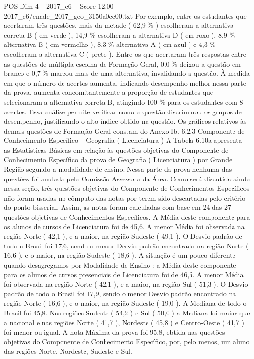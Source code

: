 \begin{textsample}{POS Dim 4 – 2017\_c6 – Score 12.00 – 2017\_c6/enade\_2017\_geo\_3150a0cc00.txt}
Por exemplo, entre os estudantes que acertaram três questões, mais da metade ( 62,9 \% ) escolheram a alternativa correta B ( em verde ), 14,9 \% escolheram a alternativa D ( em roxo ), 8,9 \% alternativa E ( em vermelho ), 8,3 \% alternativa A ( em azul ) e 4,3 \% escolheram a alternativa C ( preto ).
Entre os que acertaram três respostas entre as questões de múltipla escolha de Formação Geral, 0,0 \% deixou a questão em branco e 0,7 \% marcou mais de uma alternativa, invalidando a questão.
À medida em que o número de acertos aumenta, indicando desempenho melhor nessa parte da prova, aumenta concomitantemente a proporção de estudantes que selecionaram a alternativa correta B, atingindo 100 \% para os estudantes com 8 acertos.
Essa análise permite verificar como a questão discriminou os grupos de desempenho, justificando o alto índice obtido na questão.
Os gráficos relativos às demais questões de Formação Geral constam do Anexo Ib. 6.2.3 Componente de Conhecimento Específico – Geografia ( Licenciatura ) A Tabela 6.10a apresenta as Estatísticas Básicas em relação às questões objetivas do Componente de Conhecimento Específico da prova de Geografia ( Licenciatura ) por Grande Região segundo a modalidade de ensino.
Nessa parte da prova nenhuma das questões foi anulada pela Comissão Assessora da Área.
Como será discutido ainda nessa seção, três questões objetivas do Componente de Conhecimentos Específicos não foram usadas no cômputo das notas por terem sido descartadas pelo critério do ponto-bisserial.
Assim, as notas foram calculadas com base em 24 das 27 questões objetivas de Conhecimentos Específicos.
A Média deste componente para os alunos de cursos de Licenciatura foi de 45,6.
A menor Média foi observada na região Norte ( 42,1 ), e a maior, na região Sudeste ( 49,1 ).
O Desvio padrão de todo o Brasil foi 17,6, sendo o menor Desvio padrão encontrado na região Norte ( 16,6 ), e o maior, na região Sudeste ( 18,6 ).
A situação é um pouco diferente quando desagregamos por Modalidade de Ensino : a Média deste componente para os alunos de cursos presenciais de Licenciatura foi de 46,5.
A menor Média foi observada na região Norte ( 42,1 ), e a maior, na região Sul ( 51,3 ).
O Desvio padrão de todo o Brasil foi 17,9, sendo o menor Desvio padrão encontrado na região Norte ( 16,6 ), e o maior, na região Sudeste ( 19,0 ).
A Mediana de todo o Brasil foi 45,8.
Nas regiões Sudeste ( 54,2 ) e Sul ( 50,0 ) a Mediana foi maior que a nacional e nas regiões Norte ( 41,7 ), Nordeste ( 45,8 ) e Centro-Oeste ( 41,7 ) foi menor ou igual.
A nota Máxima da prova foi 95,8, obtida nas questões objetivas do Componente de Conhecimento Específico, por, pelo menos, um aluno das regiões Norte, Nordeste, Sudeste e Sul.

\end{textsample}
